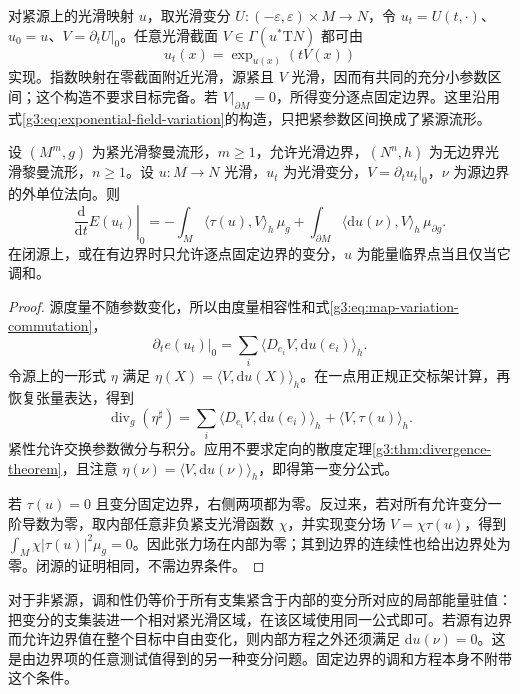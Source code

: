 \ProseParagraphBreak

对紧源上的光滑映射 \(u\)，取光滑变分 \(U:(-\varepsilon,\varepsilon)\times M\to N\)，令 \(u_t=U(t,\cdot)\)、\(u_0=u\)、\(V=\partial_tU|_0\)。任意光滑截面 \(V\in\Gamma(u^*\mathrm TN)\) 都可由
\[
	u_t(x)=\exp_{u(x)}(tV(x))
\]
实现。指数映射在零截面附近光滑，源紧且 \(V\) 光滑，因而有共同的充分小参数区间；这个构造不要求目标完备。若 \(V|_{\partial M}=0\)，所得变分逐点固定边界。这里沿用式\eqref{g3:eq:exponential-field-variation}的构造，只把紧参数区间换成了紧源流形。

\begin{theorem}\label{g3:thm:harmonic-map-first-variation}
	设 \((M^m,g)\) 为紧光滑黎曼流形，\(m\ge1\)，允许光滑边界，\((N^n,h)\) 为无边界光滑黎曼流形，\(n\ge1\)。设 \(u:M\to N\) 光滑，\(u_t\) 为光滑变分，\(V=\partial_tu_t|_0\)，\(\nu\) 为源边界的外单位法向。则
	\begin{equation}\label{g3:eq:harmonic-map-first-variation}
		\left.\frac{\mathrm d}{\mathrm dt}E(u_t)\right|_0
		=-\int_M\langle\tau(u),V\rangle_h\,\mu_g
		+\int_{\partial M}\langle\mathrm du(\nu),V\rangle_h\,\mu_{\partial g}.
	\end{equation}
	在闭源上，或在有边界时只允许逐点固定边界的变分，\(u\) 为能量临界点当且仅当它调和。
\end{theorem}
\begin{proof}
	源度量不随参数变化，所以由度量相容性和式\eqref{g3:eq:map-variation-commutation}，
	\[
		\left.\partial_t e(u_t)\right|_0
		=\sum_i\langle D_{e_i}V,\mathrm du(e_i)\rangle_h.
	\]
	令源上的一形式 \(\eta\) 满足 \(\eta(X)=\langle V,\mathrm du(X)\rangle_h\)。在一点用正规正交标架计算，再恢复张量表达，得到
	\[
		\operatorname{div}_g(\eta^\sharp)
		=\sum_i\langle D_{e_i}V,\mathrm du(e_i)\rangle_h
		+\langle V,\tau(u)\rangle_h.
	\]
	紧性允许交换参数微分与积分。应用不要求定向的散度定理\cref{g3:thm:divergence-theorem}，且注意 \(\eta(\nu)=\langle V,\mathrm du(\nu)\rangle_h\)，即得第一变分公式。

	若 \(\tau(u)=0\) 且变分固定边界，右侧两项都为零。反过来，若对所有允许变分一阶导数为零，取内部任意非负紧支光滑函数 \(\chi\)，并实现变分场 \(V=\chi\tau(u)\)，得到 \(\int_M\chi|\tau(u)|^2\mu_g=0\)。因此张力场在内部为零；其到边界的连续性也给出边界处为零。闭源的证明相同，不需边界条件。
\end{proof}

对于非紧源，调和性仍等价于所有支集紧含于内部的变分所对应的局部能量驻值：把变分的支集装进一个相对紧光滑区域，在该区域使用同一公式即可。若源有边界而允许边界值在整个目标中自由变化，则内部方程之外还须满足 \(\mathrm du(\nu)=0\)。这是由边界项的任意测试值得到的另一种变分问题。固定边界的调和方程本身不附带这个条件。

